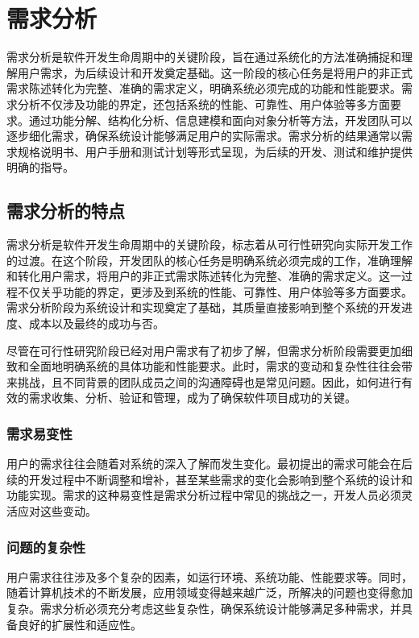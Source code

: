 \section{需求分析}

需求分析是软件开发生命周期中的关键阶段，旨在通过系统化的方法准确捕捉和理解用户需求，为后续设计和开发奠定基础。这一阶段的核心任务是将用户的非正式需求陈述转化为完整、准确的需求定义，明确系统必须完成的功能和性能要求。需求分析不仅涉及功能的界定，还包括系统的性能、可靠性、用户体验等多方面要求。通过功能分解、结构化分析、信息建模和面向对象分析等方法，开发团队可以逐步细化需求，确保系统设计能够满足用户的实际需求。需求分析的结果通常以需求规格说明书、用户手册和测试计划等形式呈现，为后续的开发、测试和维护提供明确的指导。

\subsection{需求分析的特点}

需求分析是软件开发生命周期中的关键阶段，标志着从可行性研究向实际开发工作的过渡。在这个阶段，开发团队的核心任务是明确系统必须完成的工作，准确理解和转化用户需求，将用户的非正式需求陈述转化为完整、准确的需求定义。这一过程不仅关乎功能的界定，更涉及到系统的性能、可靠性、用户体验等多方面要求。需求分析阶段为系统设计和实现奠定了基础，其质量直接影响到整个系统的开发进度、成本以及最终的成功与否。

尽管在可行性研究阶段已经对用户需求有了初步了解，但需求分析阶段需要更加细致和全面地明确系统的具体功能和性能要求。此时，需求的变动和复杂性往往会带来挑战，且不同背景的团队成员之间的沟通障碍也是常见问题。因此，如何进行有效的需求收集、分析、验证和管理，成为了确保软件项目成功的关键。

\subsubsection{需求易变性}

用户的需求往往会随着对系统的深入了解而发生变化。最初提出的需求可能会在后续的开发过程中不断调整和增补，甚至某些需求的变化会影响到整个系统的设计和功能实现。需求的这种易变性是需求分析过程中常见的挑战之一，开发人员必须灵活应对这些变动。

\subsubsection{问题的复杂性}

用户需求往往涉及多个复杂的因素，如运行环境、系统功能、性能要求等。同时，随着计算机技术的不断发展，应用领域变得越来越广泛，所解决的问题也变得愈加复杂。需求分析必须充分考虑这些复杂性，确保系统设计能够满足多种需求，并具备良好的扩展性和适应性。

